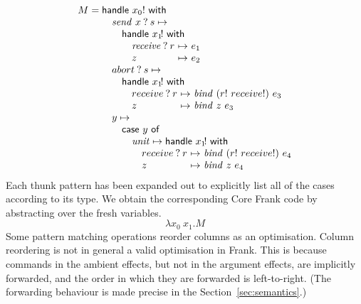 \documentclass[preprint]{sigplanconf}
\makeatletter
\newcommand\ba{\begin{array}}
\newcommand\ea{\end{array}}
\newcommand{\bstack}{\begin{array}[t]{@{}l@{}}}
\newcommand{\estack}{\end{array}}
\newenvironment{clauses}{\ba{@{}l@{~}c@{~}l@{}}}{\ea}
\newcommand{\key}[1]{\mathsf{#1}}
\newcommand{\var}{\mathit}
\newcommand{\handleSymbol}{\mathbin{?}}
\newcommand{\handle}[2]{{#1} \handleSymbol {#2}}
\newcommand{\force}[1]{{#1}!}
\makeatother
\begin{document}
\[
M = \bstack
    \key{handle}~\force{x_0}~\key{with} \\
    \quad \handle{\var{send}~x}{s} \mapsto \\
    \quad\quad \key{handle}~\force{x_1\!}~\key{with} \\
    \quad\quad\quad \begin{clauses}
                    \handle{\var{receive}}{r} &\mapsto& e_1 \\
                    z                         &\mapsto& e_2 \\
                    \end{clauses} \\
    \quad \handle{abort}{s} \mapsto \\
    \quad\quad \key{handle}~\force{x_1\!}~\key{with} \\
    \quad\quad\quad \begin{clauses}
                    \handle{receive}{r} &\mapsto&
                      \var{bind}~(\force{r}~\force{receive})~e_3 \\
                    z &\mapsto& \var{bind}~z~e_3 \\
                    \end{clauses} \\
    \quad  y \mapsto \\
    \quad\quad  \key{case}~y~\key{of} \\
    \quad\quad\quad  \var{unit} \mapsto \key{handle}~\force{x_1\!}~\key{with} \\
    \quad\quad\quad\quad \begin{clauses}
                         \handle{receive}{r} &\mapsto&
                            \var{bind}~(\force{r}~\force{receive})~e_4 \\
                         z &\mapsto& \var{bind}~z~e_4 \\
                         \end{clauses} \\
\estack
\]
Each thunk pattern has been expanded out to explicitly list all of the
cases according to its type. We obtain the corresponding Core Frank
code by abstracting over the fresh variables.
%
\[
\lambda x_0~x_1.M
\]
Some pattern matching operations reorder columns as an
optimisation. Column reordering is not in general a valid optimisation
in Frank. This is because commands in the ambient effects, but not in
the argument effects, are implicitly forwarded, and the order in which
they are forwarded is left-to-right. (The forwarding behaviour is made
precise in the Section~\ref{sec:semantics}.)
\end{document}
